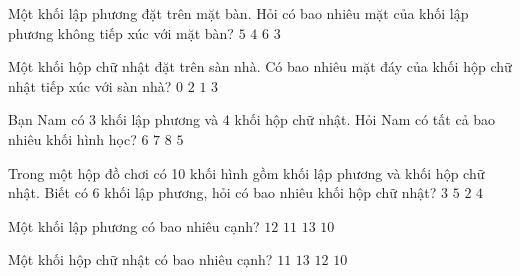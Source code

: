 \begin{ex} %
Một khối lập phương đặt trên mặt bàn. Hỏi có bao nhiêu mặt của khối lập phương không tiếp xúc với mặt bàn?
\choice
{\True $5$}
{$4$}
{$6$}
{$3$}
\end{ex}

\begin{ex} %
Một khối hộp chữ nhật đặt trên sàn nhà. Có bao nhiêu mặt đáy của khối hộp chữ nhật tiếp xúc với sàn nhà?
\choice
{$0$}
{$2$}
{\True $1$}
{$3$}
\end{ex}

\begin{ex} %
Bạn Nam có 3 khối lập phương và 4 khối hộp chữ nhật. Hỏi Nam có tất cả bao nhiêu khối hình học?
\choice
{$6$}
{\True $7$}
{$8$}
{$5$}
\end{ex}

\begin{ex} %
Trong một hộp đồ chơi có 10 khối hình gồm khối lập phương và khối hộp chữ nhật. Biết có 6 khối lập phương, hỏi có bao nhiêu khối hộp chữ nhật?
\choice
{$3$}
{$5$}
{$2$}
{\True $4$}
\end{ex}

\begin{ex} %
Một khối lập phương có bao nhiêu cạnh?
\choice
{\True $12$}
{$11$}
{$13$}
{$10$}
\end{ex}

\begin{ex} %
Một khối hộp chữ nhật có bao nhiêu cạnh?
\choice
{$11$}
{$13$}
{\True $12$}
{$10$}
\end{ex}

